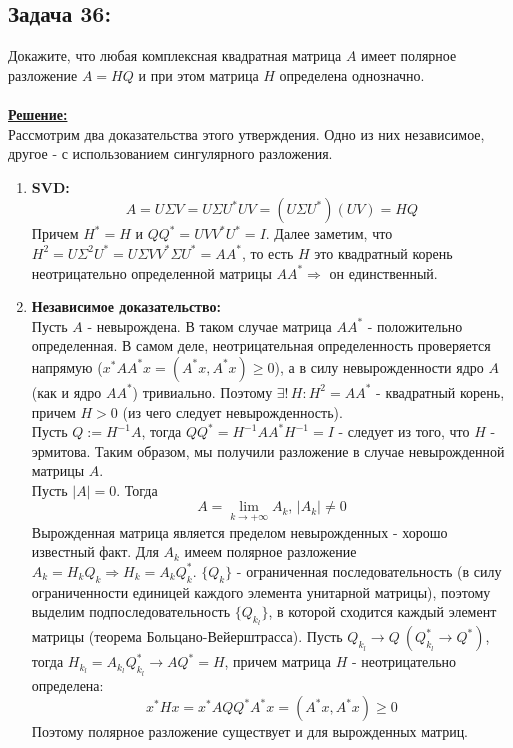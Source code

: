 \documentclass[a4paper,12pt,titlepage,final]{article}
\begin{document}
\subsection*{Задача 36:}
\noindent Докажите, что любая комплексная квадратная матрица $A$ имеет полярное разложение $A = HQ$ и при этом матрица $H$ определена однозначно.\\ \\
\textbf{\underline{Решение:}} \\
Рассмотрим два доказательства этого утверждения. Одно из них независимое, другое - с использованием сингулярного разложения.
\begin{enumerate}
\item \textbf{SVD:}
$$A = U\Sigma V = U\Sigma U^*U V = (U\Sigma U^*)(UV) = HQ$$
Причем $H^* = H$ и $QQ^* = UVV^*U^* = I$. Далее заметим, что $H^2 = U\Sigma^2U^* = U\Sigma VV^* \Sigma U^* = AA^*$, то есть $H$ это квадратный корень неотрицательно определенной матрицы $AA^* \Rightarrow$ он единственный.
\item \textbf{Независимое доказательство:} \\
Пусть $A$ - невырождена. В таком случае матрица $AA^*$ - положительно определенная. В самом деле, неотрицательная определенность проверяется напрямую ($x^*AA^*x = (A^*x, A^*x) \geq 0$), а в силу невырожденности ядро $A$ (как и ядро $AA^*$) тривиально.
Поэтому $\exists! \, H: H^2 = AA^*$ - квадратный корень, причем $H > 0$ (из чего следует невырожденность). \\
Пусть $Q := H^{-1}A$, тогда $QQ^* = H^{-1}AA^*H^{-1} = I$ - следует из того, что $H$ - эрмитова. Таким образом, мы получили разложение в случае невырожденной матрицы $A$. \\
Пусть $|A| = 0$. Тогда $$A = \lim_{k \to +\infty}A_k, \, |A_k| \neq 0$$
Вырожденная матрица является пределом невырожденных - хорошо известный факт. Для $A_k$ имеем полярное разложение $A_k = H_kQ_k \Rightarrow H_k = A_kQ_k^*$. $\{Q_k\}$ - ограниченная последовательность 
(в силу ограниченности единицей каждого элемента унитарной матрицы), поэтому выделим подпоследовательность $\{Q_{k_l}\}$, в которой сходится каждый элемент матрицы (теорема Больцано-Вейерштрасса).
Пусть $Q_{k_l} \to Q \:(Q_{k_l}^* \to Q^*)$, тогда $H_{k_l} = A_{k_l}Q_{k_l}^* \to AQ^* = H$, причем матрица $H$ - неотрицательно определена:
$$ x^*Hx = x^*AQQ^*A^*x = (A^*x, A^*x) \geq 0$$
Поэтому полярное разложение существует и для вырожденных матриц. \blacksquare \\ \\ \\
\end{enumerate}
\end{document}
